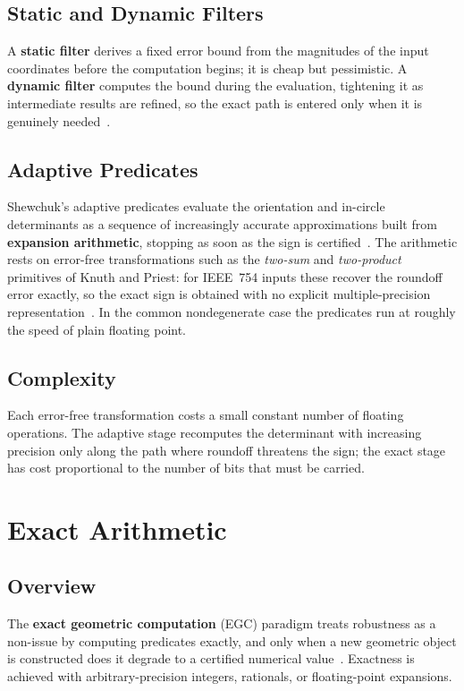 \subsection{Static and Dynamic Filters}
A \textbf{static filter} derives a fixed error bound from the magnitudes of
the input coordinates before the computation begins; it is cheap but
pessimistic. A \textbf{dynamic filter} computes the bound during the
evaluation, tightening it as intermediate results are refined, so the exact
path is entered only when it is genuinely needed~\cite{bronnimann2001}.

\subsection{Adaptive Predicates}
Shewchuk's adaptive predicates evaluate the orientation and in-circle
determinants as a sequence of increasingly accurate approximations built
from \textbf{expansion arithmetic}, stopping as
soon as the sign is certified~\cite{shewchuk1997}. The arithmetic rests on
error-free transformations such as the \emph{two-sum} and \emph{two-product}
primitives of Knuth and Priest: for IEEE~754 inputs these recover the
roundoff error exactly, so the exact sign is obtained with no explicit
multiple-precision representation~\cite{priest1991,goldberg1991}. In the
common nondegenerate case the predicates run at roughly the speed of plain
floating point.

\subsection{Complexity}
Each error-free transformation costs a small constant number of floating
operations. The adaptive stage recomputes the determinant with increasing
precision only along the path where roundoff threatens the sign; the exact
stage has cost proportional to the number of bits that must be carried.

\section{Exact Arithmetic}
\label{sec:exact_arithmetic}

\subsection{Overview}
The \textbf{exact geometric computation}
(EGC) paradigm treats robustness as a non-issue by computing predicates
exactly, and only when a new geometric object is constructed does it degrade
to a certified numerical value~\cite{yap1997}. Exactness is achieved with
arbitrary-precision integers, rationals, or floating-point expansions.

